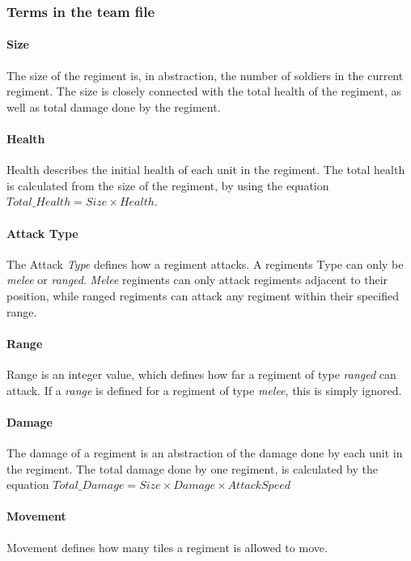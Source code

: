 		\subsubsection{Terms in the team file }	
		\paragraph{Size}
		The size of the regiment is, in abstraction, the number of soldiers in the current regiment. 
		The size is closely connected with the total health of the regiment, as well as total damage done by the regiment.

		\paragraph{Health}
		Health describes the initial health of each unit in the regiment.
		The total health is calculated from the size of the regiment, by using the equation\label{Total_Health} $Total\_Health = Size \times Health$.
		
		\paragraph{Attack Type}
		The Attack \textit{Type} defines how a regiment attacks. A regiments Type can only be \textit{melee} or \textit{ranged}.
		\textit{Melee} regiments can only attack regiments adjacent to their position, while ranged regiments 
		can attack any regiment within their specified range.
		
		\paragraph{Range}
		Range is an integer value, which defines how far a regiment of type \textit{ranged} can attack. 
		If a \textit{range} is defined for a regiment of type \textit{melee}, this is simply ignored.
		
		\paragraph{Damage}
		The damage of a regiment is an abstraction of the damage done by each unit in the regiment.
		The total damage done by one regiment, is calculated by the equation\label{Total_Damage} $Total\_Damage = Size \times Damage \times AttackSpeed$ 
		
		\paragraph{Movement}
		Movement defines how many tiles a regiment is allowed to move.
		
